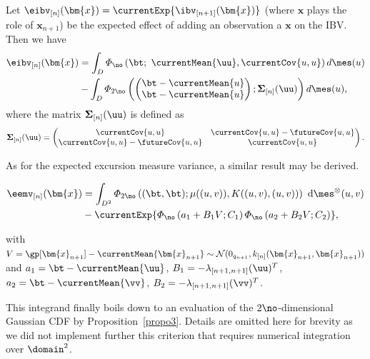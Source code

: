 \begin{propo}
\label{propo_eibv}
Let $\eibv_{[n]}(\bm{x})=\currentExp{\ibv_{[n+1]}(\bm{x})}$ (where $\bm{x}$ plays
the role of $\bm{x}_{n+1}$) be the expected effect of adding an observation a $\bm{x}$ on the IBV.
Then we have
\begin{equation}
\begin{split}
\eibv_{[n]}(\bm{x})
&=\int_{D} \varPhi_{\no}\left(\bt;~\currentMean{\uu}, \currentCov{u, u}\right) d\mes(u)\\
&-\int_{D} \varPhi_{2\no}
\left(
\left(
\begin{matrix}
\bt-\currentMean{u}\\
\bt-\currentMean{u}
\end{matrix}
\right);
\mathbf{\Sigma}_{[n]}(\uu)
\right)
d\mes(u),
\end{split}
\end{equation}
where the matrix $\mathbf{\Sigma}_{[n]}(\uu)$ is defined as
\begin{equation*}
\begin{split}
\mathbf{\Sigma}_{[n]}(\uu)&=
\left(
\begin{matrix}
\currentCov{u, u} & \currentCov{u, u}-\futureCov{u, u}\\
\currentCov{u, u}-\futureCov{u, u} & \currentCov{u, u}
\end{matrix}
\right).\\
\end{split}
\end{equation*}
\end{propo}

As for the expected excursion measure variance, a similar result may be derived.
\begin{propo}
\label{propo_emv}

\begin{equation*}
\begin{split}
\eemv_{[n]}(\bm{x})
&=\int_{D^2} 
\varPhi_{2\no}
\left(
(\bt, \bt); \mu((u,v)), 
K((u,v),(u,v))
\right) 
\
\mathrm{d}\mes^{\otimes} %
(u,v)\\
&-\currentExp{
    \varPhi_{\no}\left(a_1+B_1 V; C_1\right)
    \varPhi_{\no}\left(a_2+B_2 V; C_2\right)
},
\end{split}
\end{equation*}

with $V=\gp[\bm{x}_{n+1}]-\currentMean{\bm{x}_{n+1}} \sim \mathcal{N}(0_{q_{n+1}},k_{[n]}(\bm{x}_{n+1},\bm{x}_{n+1}))$ and $a_1=\bt-\currentMean{\uu}$,
$B_1=-\lambda_{[n+1,n+1]}(\uu)^T$, $a_2=\bt-\currentMean{\vv}$, $B_2=-\lambda_{[n+1,n+1]}(\vv)^T$.

This integrand finally boils down to an evaluation of the $2\no$-dimensional Gaussian CDF by
Proposition~\ref{propo3}. Details are omitted here for brevity as we did not implement further
this criterion that requires numerical integration over $\domain^2$.
\end{propo}


